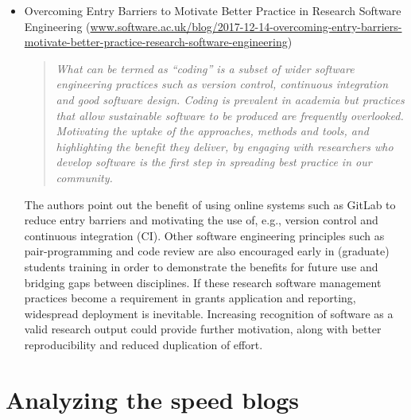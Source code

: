 \documentclass[11pt,letterpaper]{article}
\newcommand{\katznote}[1]{ {\textcolor{magenta}    { ***Dan: #1 }}}
\newcommand{\sdnote}[1]{ {\textcolor{darkgreen}    { ***Stephan: #1 }}}
\begin{document}
\begin{itemize}
\item Overcoming Entry Barriers to Motivate Better Practice in Research Software Engineering (\href{https://www.software.ac.uk/blog/2017-12-14-overcoming-entry-barriers-motivate-better-practice-research-software-engineering}{www.software.ac.uk/blog/2017-12-14-overcoming-entry-barriers-motivate-better-practice-research-software-engineering})
\begin{quote}\textit{
What can be termed as ``coding'' is a subset of wider software engineering practices such as version control, continuous integration and good software design. Coding is prevalent in academia but practices that allow sustainable software to be produced are frequently overlooked.  Motivating the uptake of the approaches, methods and tools, and highlighting the benefit they deliver, by engaging with researchers who develop software is the first step in spreading best practice in our community.}
\end{quote}
The authors point out the benefit of using online systems such as GitLab to reduce entry barriers and motivating the use of, e.g., version control and continuous integration (CI). Other software engineering principles such as pair-programming and code review are also encouraged early in (graduate) students training in order to demonstrate the benefits for future use and bridging gaps between disciplines. If these research software management practices become a requirement in grants application and reporting, widespread deployment is inevitable. Increasing recognition of software as a valid research output could provide further motivation, along with better reproducibility and reduced duplication of effort.

\end{itemize}


\section{Analyzing the speed blogs} \label{sec:speed_blog_analysis}

\end{document}
